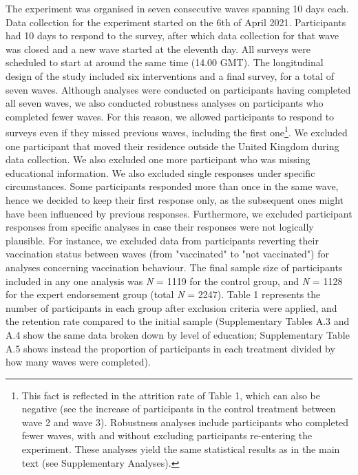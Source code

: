 \documentclass[authordate, empirical]{jote-new-article}
\begin{document}
The experiment was organised in seven consecutive waves spanning 10 days each. Data collection for the experiment started on the 6th of April 2021. Participants had 10 days to respond to the survey, after which data collection for that wave was closed and a new wave started at the eleventh day. All surveys were scheduled to start at around the same time (14.00 GMT). The longitudinal design of the study included six interventions and a final survey, for a total of seven waves. Although analyses were conducted on participants having completed all seven waves, we also conducted robustness analyses on participants who completed fewer waves. For this reason, we allowed participants to respond to surveys even if they missed previous waves, including the first one\footnote{ This fact is reflected in the attrition rate of Table 1, which can also be negative (see the increase of participants in the control treatment between wave 2 and wave 3). Robustness analyses include participants who completed fewer waves, with and without excluding participants re-entering the experiment. These analyses yield the same statistical results as in the main text (see Supplementary Analyses).}. We excluded one participant that moved their residence outside the United Kingdom during data collection. We also excluded one more participant who was missing educational information. We also excluded single responses under specific circumstances. Some participants responded more than once in the same wave, hence we decided to keep their first response only, as the subsequent ones might have been influenced by previous responses. Furthermore, we excluded participant responses from specific analyses in case their responses were not logically plausible. For instance, we excluded data from participants reverting their vaccination status between waves (from "vaccinated" to "not vaccinated") for analyses concerning vaccination behaviour. The final sample size of participants included in any one analysis was \emph{N }= 1119 for the control group, and \emph{N }= 1128 for the expert endorsement group (total \emph{N }= 2247). Table 1 represents the number of participants in each group after exclusion criteria were applied, and the retention rate compared to the initial sample (Supplementary Tables A.3 and A.4 show the same data broken down by level of education; Supplementary Table A.5 shows instead the proportion of participants in each treatment divided by how many waves were completed).
\end{document}
